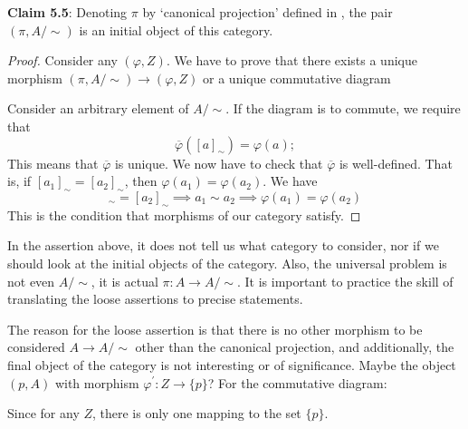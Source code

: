 \documentclass{report}
\begin{document}
\textbf{Claim 5.5}: Denoting $\pi$ by `canonical projection' defined in , the pair $(\pi, A/\sim )$ is an initial object of this category.

\begin{proof}
    Consider any $(\varphi, Z)$. We have to prove that there exists a unique morphism $(\pi, A/\sim ) \rightarrow (\varphi, Z)$ or a unique commutative diagram
        \begin{center}
        \end{center}
    Consider an arbitrary element of $A/\sim $. If the diagram is to commute, we require that
        \begin{equation*}
            \overline{\varphi}([a]_{\sim }) = \varphi(a);
        \end{equation*}
    This means that $\overline{\varphi}$ is unique. We now have to check that $\overline{\varphi}$ is well-defined. That is, if $[a_{1}]_{\sim } = [a_{2}]_{\sim }$, then $\varphi(a_{1}) = \varphi(a_{2})$. We have
        \begin{equation*}
            [a_{1}]_{\sim } = [a_{2}]_{\sim } \implies a_{1} \sim a_{2} \implies \varphi(a_{1}) = \varphi(a_{2})
        \end{equation*}
    This is the condition that morphisms of our category satisfy.
\end{proof}

In the assertion above, it does not tell us what category to consider, nor if we should look at the initial objects of the category. Also, the universal problem is not even $A/\sim $, it is actual $\pi: A \rightarrow A/\sim $. It is important to practice the skill of translating the loose assertions to precise statements. 

The reason for the loose assertion is that there is no other morphism to be considered $A \rightarrow A/\sim $ other than the canonical projection, and additionally, the final object of the category is not interesting or of significance. Maybe the object $(p, A)$ with morphism $\varphi^{\prime} : Z \rightarrow \{p\}$? For the commutative diagram:
    \begin{center}
    \end{center}
Since for any $Z$, there is only one mapping to the set $\{p\}$.
\end{document}
